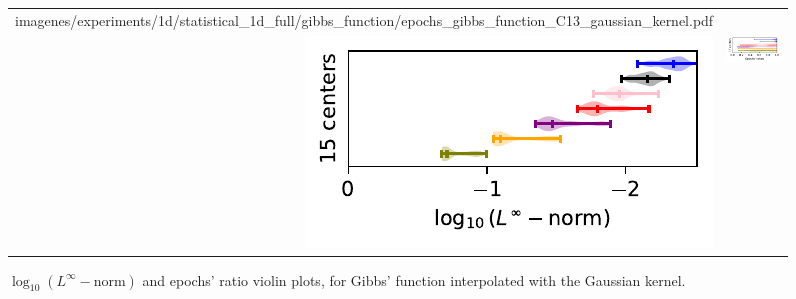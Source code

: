 \documentclass[12pt]{report} %
\begin{document}
\begin{figure}[H]
\begin{tabular}{rl}
{        {imagenes/experiments/1d/statistical_1d_full/gibbs_function/epochs_gibbs_function_C13_gaussian_kernel.pdf}}
    \\
    {\includegraphics[width=.5\textwidth, trim={0 0.2cm 0 0},clip=true]
    {imagenes/experiments/1d/statistical_1d_full/gibbs_function/linf_gibbs_function_C15_gaussian_kernel.pdf}}
                                                                                                              & 
  {\includegraphics[width=.44\textwidth, trim={.7cm 0.2cm 0 0.2cm},clip=true]
        {imagenes/experiments/1d/statistical_1d_full/gibbs_function/epochs_gibbs_function_C15_gaussian_kernel.pdf}}
  \end{tabular}
  \caption{$\log_{10}(L^\infty-\text{norm})$ and epochs' ratio violin plots, for Gibbs' function interpolated with the Gaussian kernel.}
  \label{fig:statistic-result-gibbs-function-gaussian-kernel}
\end{figure}
\end{document}

